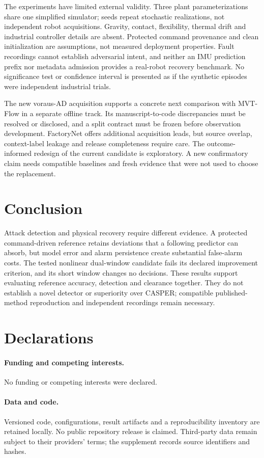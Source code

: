 \documentclass[11pt]{article}
\begin{document}
The experiments have limited external validity. Three plant parameterizations share one simplified simulator; seeds repeat stochastic realizations, not independent robot acquisitions. Gravity, contact, flexibility, thermal drift and industrial controller details are absent. Protected command provenance and clean initialization are assumptions, not measured deployment properties. Fault recordings cannot establish adversarial intent, and neither an IMU prediction prefix nor metadata admission provides a real-robot recovery benchmark. No significance test or confidence interval is presented as if the synthetic episodes were independent industrial trials.

The new voraus-AD acquisition supports a concrete next comparison with MVT-Flow in a separate offline track. Its manuscript-to-code discrepancies must be resolved or disclosed, and a split contract must be frozen before observation development. FactoryNet offers additional acquisition leads, but source overlap, context-label leakage and release completeness require care. The outcome-informed redesign of the current candidate is exploratory. A new confirmatory claim needs compatible baselines and fresh evidence that were not used to choose the replacement.

\section{Conclusion}
Attack detection and physical recovery require different evidence. A protected command-driven reference retains deviations that a following predictor can absorb, but model error and alarm persistence create substantial false-alarm costs. The tested nonlinear dual-window candidate fails its declared improvement criterion, and its short window changes no decisions. These results support evaluating reference accuracy, detection and clearance together. They do not establish a novel detector or superiority over CASPER; compatible published-method reproduction and independent recordings remain necessary.

\section*{Declarations}
\paragraph{Funding and competing interests.} No funding or competing interests were declared.
\paragraph{Data and code.} Versioned code, configurations, result artifacts and a reproducibility inventory are retained locally. No public repository release is claimed. Third-party data remain subject to their providers' terms; the supplement records source identifiers and hashes.
\end{document}
